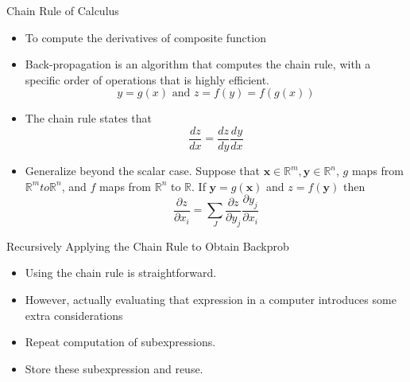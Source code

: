 \documentclass[10pt]{beamer}
\begin{document}

	\begin{frame}{Chain Rule of Calculus}
		\begin{itemize}
			\item To compute the derivatives of composite function
			\item Back-propagation is an algorithm that computes the chain rule, with a specific order of operations that is highly efficient.
			$$y=g(x) \text{~and~} z=f(y)=f(g(x))$$
			\item The chain rule states that
			$$\frac{dz}{dx}=\frac{dz}{dy}\frac{dy}{dx}$$
			\item Generalize beyond the scalar case. Suppose that $\bm{x}\in\mathbb{R}^m,\bm{y}\in\mathbb{R}^n$, $g$ maps from $\mathbb{R}^m to \mathbb{R}^n$, and $f$ maps from $\mathbb{R}^n$ to $\mathbb{R}$. If $\bm{y}=g(\bm{x})$ and $z=f(\bm{y})$ then
			$$\frac{\partial z}{\partial x_i}=\sum_J\frac{\partial z}{\partial y_j}\frac{\partial y_j}{\partial x_i}$$
		\end{itemize}
	\end{frame}

	\begin{frame}{Recursively Applying the Chain Rule to Obtain Backprob}
		\begin{itemize}
			\item Using the chain rule is straightforward.
			\item However, actually evaluating that expression in a computer introduces some extra considerations
			\item Repeat computation of subexpressions.
			\item Store these subexpression and reuse.
		\end{itemize}
	\end{frame}
\end{document}

